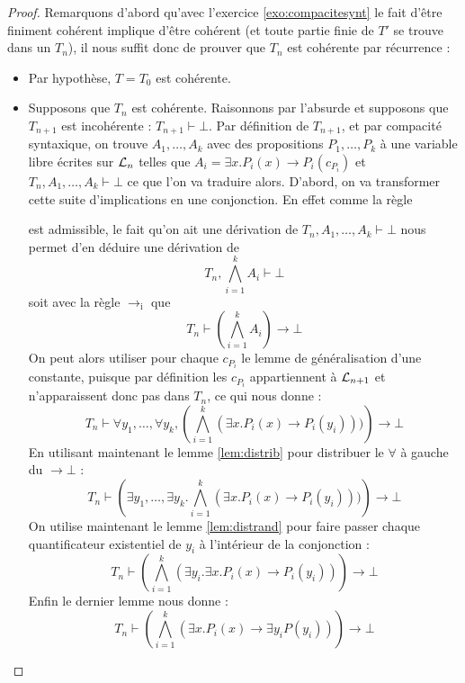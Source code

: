 \begin{proof}
    Remarquons d'abord qu'avec l'exercice \ref{exo:compacitesynt}  le fait d'être finiment cohérent implique d'être cohérent (et toute partie finie de $T'$ se trouve dans un $T_n$), il nous suffit donc de prouver que $T_n$ est cohérente par récurrence :
    \begin{itemize}[label=$\bullet$]
        \item Par hypothèse, $T=T_0$ est cohérente.
        \item Supposons que $T_n$ est cohérente. Raisonnons par l'absurde et supposons que $T_{n+1}$ est incohérente : $T_{n+1}\vdash \bot$. Par définition de $T_{n+1}$, et par compacité syntaxique, on trouve $A_1,\ldots ,A_k$ avec des propositions $P_1,\ldots,P_k$ à une variable libre écrites sur $\LL_n$ telles que $A_i = \exists x.P_i(x) \to P_i(c_{P_i})$ et $T_n,A_1,\ldots,A_k\vdash \bot$ ce que l'on va traduire alors. D'abord, on va transformer cette suite d'implications en une conjonction. En effet comme la règle \begin{prooftree}  \end{prooftree} est admissible, le fait qu'on ait une dérivation de $T_n,A_1,\ldots,A_k\vdash \bot$ nous permet d'en déduire une dérivation de $$T_n,\bigwedge_{i=1}^k A_i\vdash \bot$$ soit avec la règle $\to_\mathrm i$ que $$T_n\vdash \left( \bigwedge_{i=1}^k A_i \right)\to \bot$$
        On peut alors utiliser pour chaque $c_{P_i}$ le lemme de généralisation d'une constante, puisque par définition les $c_{P_i}$ appartiennent à $\LL_{n+1}$ et n'apparaissent donc pas dans $T_n$, ce qui nous donne : $$T_n\vdash \forall y_1,\ldots,\forall y_k, \left( \bigwedge_{i=1}^k (\exists x. P_i(x)\to P_i(y_i)))\right)\to \bot$$ En utilisant maintenant le lemme \ref{lem:distrib} pour distribuer le $\forall$ à gauche du $\to \bot$ : $$T_n\vdash \left(\exists y_1,\ldots,\exists y_k. \bigwedge_{i=1}^k (\exists x.P_i(x)\to P_i(y_i)))\right)\to \bot$$ On utilise maintenant le lemme \ref{lem:distrand} pour faire passer chaque quantificateur existentiel de $y_i$ à l'intérieur de la conjonction : $$T_n\vdash \left(\bigwedge_{i=1}^k (\exists y_i.\exists x. P_i(x)\to P_i(y_i))\right)\to \bot$$ Enfin le dernier lemme nous donne : $$T_n\vdash \left(\bigwedge_{i=1}^k (\exists x. P_i(x) \to \exists y_i P(y_i))\right)\to\bot$$


\end{itemize}
\end{proof}
